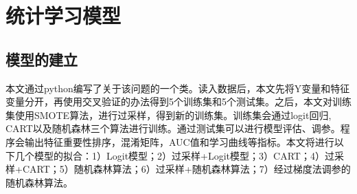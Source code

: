 \documentclass{article}
\begin{document}
\section{统计学习模型}
\subsection{模型的建立}
\par 本文通过python编写了关于该问题的一个类。读入数据后，本文先将Y变量和特征变量分开，再使用交叉验证的办法得到5个训练集和5个测试集。之后，本文对训练集使用SMOTE算法，进行过采样，得到新的训练集。训练集会通过logit回归, CART以及随机森林三个算法进行训练。通过测试集可以进行模型评估、调参。程序会输出特征重要性排序，混淆矩阵，AUC值和学习曲线等指标。本文将进行以下几个模型的拟合：1）Logit模型；2）过采样+Logit模型；3）CART；4）过采样+CART；5）随机森林算法；6）过采样+随机森林算法；7）经过梯度法调参的随机森林算法。
\end{document}
